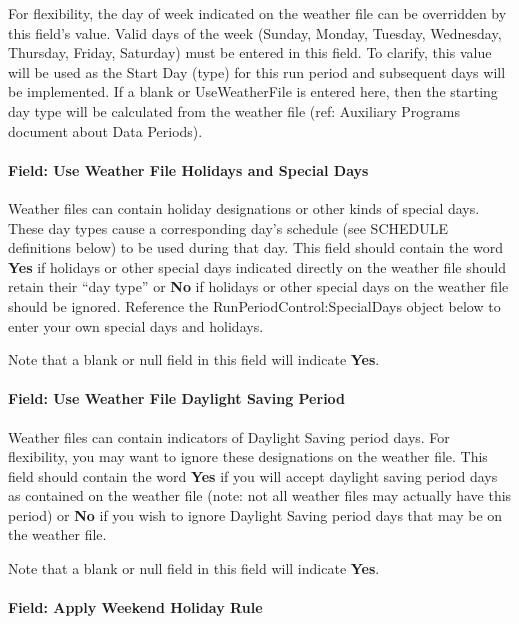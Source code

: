 For flexibility, the day of week indicated on the weather file can be overridden by this field's value. Valid days of the week (Sunday, Monday, Tuesday, Wednesday, Thursday, Friday, Saturday) must be entered in this field. To clarify, this value will be used as the Start Day (type) for this run period and subsequent days will be implemented. If a blank or UseWeatherFile is entered here, then the starting day type will be calculated from the weather file (ref: Auxiliary Programs document about Data Periods).

\paragraph{Field: Use Weather File Holidays and Special Days}\label{field-use-weather-file-holidays-and-special-days-1}

Weather files can contain holiday designations or other kinds of special days. These day types cause a corresponding day's schedule (see SCHEDULE definitions below) to be used during that day. This field should contain the word \textbf{Yes} if holidays or other special days indicated directly on the weather file should retain their ``day type'' or \textbf{No} if holidays or other special days on the weather file should be ignored. Reference the RunPeriodControl:SpecialDays object below to enter your own special days and holidays.

Note that a blank or null field in this field will indicate \textbf{Yes}.

\paragraph{Field: Use Weather File Daylight Saving Period}\label{field-use-weather-file-daylight-saving-period-3}

Weather files can contain indicators of Daylight Saving period days. For flexibility, you may want to ignore these designations on the weather file. This field should contain the word \textbf{Yes} if you will accept daylight saving period days as contained on the weather file (note: not all weather files may actually have this period) or \textbf{No} if you wish to ignore Daylight Saving period days that may be on the weather file.

Note that a blank or null field in this field will indicate \textbf{Yes}.

\paragraph{Field: Apply Weekend Holiday Rule}\label{field-apply-weekend-holiday-rule-1}

